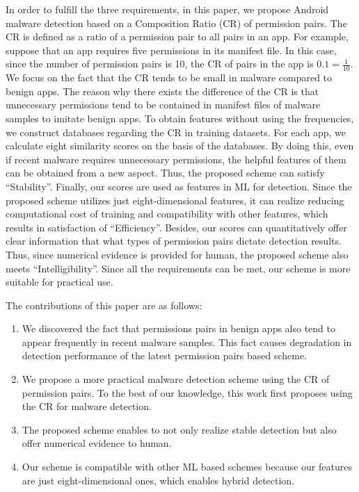 \documentclass{ieeeaccess}
\begin{document}
In order to fulfill the three requirements, in this paper, we propose Android malware detection based on a Composition Ratio (CR) of permission pairs.
The CR is defined as a ratio of a permission pair to all pairs in an app.
For example, suppose that an app requires five permissions in its manifest file.
In this case, since the number of permission pairs is 10, the CR of pairs in the app is $0.1 = \frac{1}{10}$.
We focus on the fact that the CR tends to be small in malware compared to benign apps.
The reason why there exists the difference of the CR is that unnecessary permissions tend to be contained in manifest files of malware samples to imitate benign apps.
To obtain features without using the frequencies, we construct databases regarding the CR in training datasets.
For each app, we calculate eight similarity scores on the basis of the databases.
By doing this, even if recent malware requires unnecessary permissions, the helpful features of them can be obtained from a new aspect.
Thus, the proposed scheme can satisfy ``Stability''.
Finally, our scores are used as features in ML for detection.
Since the proposed scheme utilizes just eight-dimensional features, it can realize reducing computational cost of training and compatibility with other features, which results in satisfaction of ``Efficiency''.  
Besides, our scores can quantitatively offer clear information that what types of permission pairs dictate detection results.
Thus, since numerical evidence is provided for human, the proposed scheme also meets ``Intelligibility''.
Since all the requirements can be met, our scheme is more suitable for practical use.

The contributions of this paper are as follows:
\begin{enumerate}
  \item We discovered the fact that permissions pairs in benign apps also tend to appear frequently in recent malware samples.
    This fact causes degradation in detection performance of the latest permission pairs based scheme.
  \item We propose a more practical malware detection scheme using the CR of permission pairs. 
    To the best of our knowledge, this work first proposes using the CR for malware detection.
  \item The proposed scheme enables to not only realize stable detection but also offer numerical evidence to human.
  \item Our scheme is compatible with other ML based schemes because our features are just eight-dimensional ones, which enables hybrid detection.
\end{enumerate}
\end{document}
